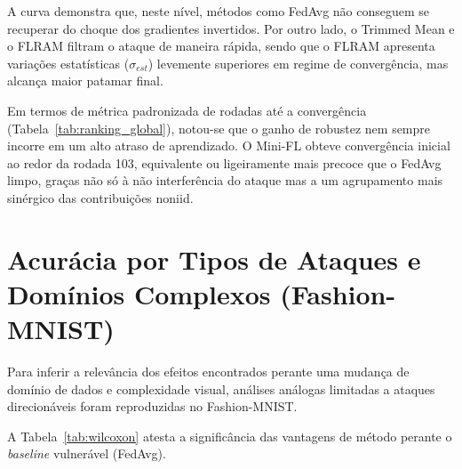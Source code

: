 A curva demonstra que, neste nível, métodos como FedAvg não conseguem se recuperar do choque dos gradientes invertidos. Por outro lado, o Trimmed Mean e o FLRAM filtram o ataque de maneira rápida, sendo que o FLRAM apresenta variações estatísticas ($\sigma_{est}$) levemente superiores em regime de convergência, mas alcança maior patamar final.

Em termos de métrica padronizada de rodadas até a convergência (Tabela~\ref{tab:ranking_global}), notou-se que o ganho de robustez nem sempre incorre em um alto atraso de aprendizado. O Mini-FL obteve convergência inicial ao redor da rodada 103, equivalente ou ligeiramente mais precoce que o FedAvg limpo, graças não só à não interferência do ataque mas a um agrupamento mais sinérgico das contribuições \gls{noniid}.

\section{Acurácia por Tipos de Ataques e Domínios Complexos (Fashion-MNIST)}
\label{sec:res-fashion}

Para inferir a relevância dos efeitos encontrados perante uma mudança de domínio de dados e complexidade visual, análises análogas limitadas a ataques direcionáveis foram reproduzidas no Fashion-MNIST.

A Tabela~\ref{tab:wilcoxon} atesta a significância das vantagens de método perante o \textit{baseline} vulnerável (FedAvg).

